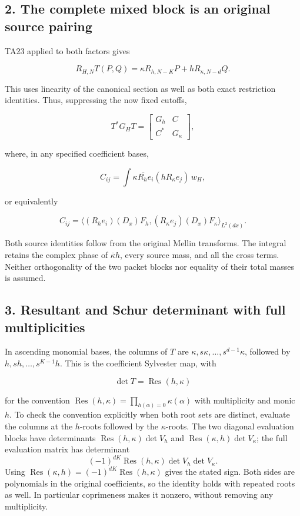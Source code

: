 \subsection*{2. The complete mixed block is an original source pairing}

TA23 applied to both factors gives

\[R_{H,N}T(P,Q)=\kappa R_{h,N-K}P+hR_{\kappa,N-d}Q.\]

This uses linearity of the canonical section as well as both exact
restriction identities. Thus, suppressing the now fixed cutoffs,

\[T^*G_HT=\begin{bmatrix}G_h&C\\C^*&G_\kappa\end{bmatrix},\]

where, in any specified coefficient bases,

\[C_{ij}=\int\overline{\kappa R_he_i}(hR_\kappa e_j)\,w_H,\]

or equivalently

\[C_{ij}=\big\langle(R_he_i)(D_x)F_h,(R_\kappa e_j)(D_x)F_\kappa\big\rangle_{L^2(dx)}.\]

Both source identities follow from the original Mellin transforms.
The integral retains the complex phase of \(\overline{\kappa}h\), every
source mass, and all the cross terms. Neither orthogonality of the two
packet blocks nor equality of their total masses is assumed.

\subsection*{3. Resultant and Schur determinant with full multiplicities}

In ascending monomial bases, the columns of \(T\) are
\(\kappa,\allowbreak s\kappa,\allowbreak\ldots,\allowbreak s^{d-1}\kappa\), followed by
\(h,\allowbreak sh,\allowbreak\ldots,\allowbreak s^{K-1}h\). This is the coefficient Sylvester map, with

\[\det T=\operatorname{Res}(h,\kappa)\]

for the convention \(\operatorname{Res}(h,\kappa)=\prod_{h(\alpha)=0}\kappa(\alpha)\)
with multiplicity and monic \(h\). To check the convention explicitly when
both root sets are distinct, evaluate the columns at the \(h\)-roots followed
by the \(\kappa\)-roots. The two diagonal evaluation blocks have determinants
\(\operatorname{Res}(h,\kappa)\det V_h\) and \(\operatorname{Res}(\kappa,h)\det V_\kappa\); the full evaluation
matrix has determinant
\[(-1)^{dK}\operatorname{Res}(h,\kappa)\det V_h\det V_\kappa.\]
Using \(\operatorname{Res}(\kappa,h)=(-1)^{dK}\operatorname{Res}(h,\kappa)\) gives the stated sign.
Both sides are polynomials in the original coefficients, so the identity
holds with repeated roots as well. In particular coprimeness makes it
nonzero, without removing any multiplicity.

